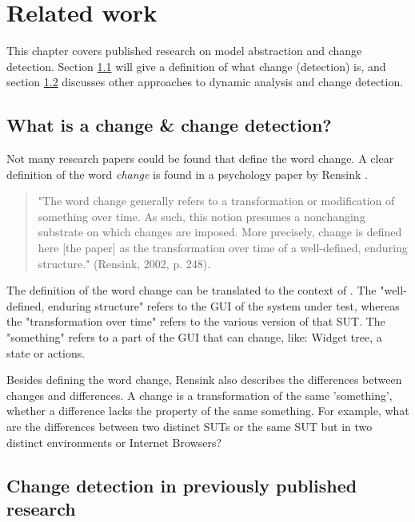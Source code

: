 \chapter{Related work} \label{chapter:related-work}

This chapter covers published research on model abstraction and change detection. Section \ref{sec:what-is-change} will give a definition of what change (detection) is, and section \ref{sec:change-detection-research} discusses other approaches to dynamic analysis and change detection. 

\section{What is a change \& change detection?} \label{sec:what-is-change}

Not many research papers could be found that define the word change. A clear definition of the word \textit{change} is found in a psychology paper by Rensink \cite{rensink2002change}.

\begin{quote}
    "The word change generally refers to a transformation or modification of something over time. As such, this notion presumes a nonchanging substrate on which changes are imposed. More precisely, change is defined here [the paper] as the transformation over time of a well-defined, enduring structure." (Rensink, 2002, p. 248).
\end{quote}

The definition of the word change can be translated to the context of \testar. The "well-defined, enduring structure" refers to the GUI of the system under test, whereas the "transformation over time" refers to the various version of that SUT. The "something" refers to a part of the GUI that can change, like: Widget tree, a state or actions. 

Besides defining the word change, Rensink also describes the differences between changes and differences. A change is a transformation of the same 'something', whether a difference lacks the property of the same something. For example, what are the differences between two distinct SUTs or the same SUT but in two distinct environments or Internet Browsers?

\section{Change detection in previously published research} \label{sec:change-detection-research}

